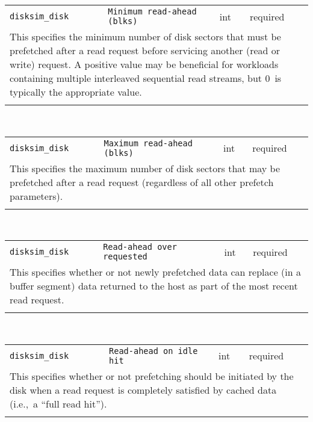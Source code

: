 \noindent 
\begin{tabular}{|p{1.5in}|p{3.5in}|p{0.5in}|p{0.5in}|}
\cline{1-4}
\texttt{disksim\_disk} & \texttt{Minimum read-ahead (blks)} & int & required \\ 
\cline{1-4}
\multicolumn{4}{|p{6in}|}{
This specifies the minimum number of disk sectors that must be prefetched
after a read request before servicing another (read or write) request.
A positive value may be beneficial for workloads containing multiple
interleaved sequential read streams, but 0~is typically the
appropriate value.
}\\ 
\cline{1-4}
\multicolumn{4}{p{5in}}{}\\
\end{tabular}\\ 
\noindent 
\begin{tabular}{|p{1.5in}|p{3.5in}|p{0.5in}|p{0.5in}|}
\cline{1-4}
\texttt{disksim\_disk} & \texttt{Maximum read-ahead (blks)} & int & required \\ 
\cline{1-4}
\multicolumn{4}{|p{6in}|}{
This specifies the maximum number of disk sectors that may be prefetched
after a read request (regardless of all other prefetch parameters).
}\\ 
\cline{1-4}
\multicolumn{4}{p{5in}}{}\\
\end{tabular}\\ 
\noindent 
\begin{tabular}{|p{1.5in}|p{3.5in}|p{0.5in}|p{0.5in}|}
\cline{1-4}
\texttt{disksim\_disk} & \texttt{Read-ahead over requested} & int & required \\ 
\cline{1-4}
\multicolumn{4}{|p{6in}|}{
This specifies whether or not newly prefetched data can replace (in a
buffer segment) data returned to the host as part of the most recent
read request.
}\\ 
\cline{1-4}
\multicolumn{4}{p{5in}}{}\\
\end{tabular}\\ 
\noindent 
\begin{tabular}{|p{1.5in}|p{3.5in}|p{0.5in}|p{0.5in}|}
\cline{1-4}
\texttt{disksim\_disk} & \texttt{Read-ahead on idle hit} & int & required \\ 
\cline{1-4}
\multicolumn{4}{|p{6in}|}{
This specifies whether or not prefetching should be initiated by the
disk when a read request is completely satisfied by cached data
(i.e.,~a ``full read hit'').
}\\ 
\cline{1-4}
\multicolumn{4}{p{5in}}{}\\
\end{tabular}\\ 
